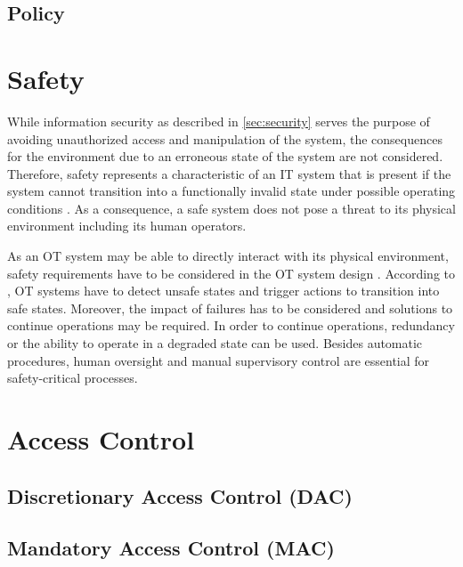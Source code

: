\subsection{Policy}

\section{Safety}
\label{sec:safety}
While information security as described in \autoref{sec:security} serves the purpose of avoiding unauthorized access and manipulation of the system, the consequences for the environment due to an erroneous state of the system are not considered.
Therefore, safety represents a characteristic of an IT system that is present if the system cannot transition into a functionally invalid state under possible operating conditions \cite{Eckert2023}.
As a consequence, a safe system does not pose a threat to its physical environment including its human operators.

As an OT system may be able to directly interact with its physical environment, safety requirements have to be considered in the OT system design \cite{Stouffer2023}.
According to \citeauthor{Stouffer2023}, OT systems have to detect unsafe states and trigger actions to transition into safe states.
Moreover, the impact of failures has to be considered and solutions to continue operations may be required.
In order to continue operations, redundancy or the ability to operate in a degraded state can be used.
Besides automatic procedures, human oversight and manual supervisory control are essential for safety-critical processes.

\section{Access Control}
\label{sec:accesscontrol}

\subsection{Discretionary Access Control (DAC)}

\subsection{Mandatory Access Control (MAC)}

